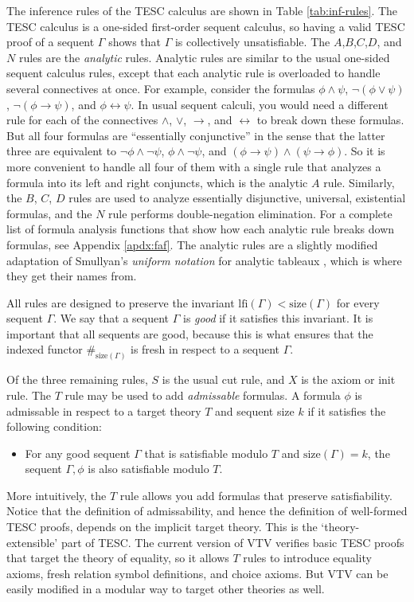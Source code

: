 \documentclass[12pt]{article}
\newcommand{\idf}[1]{\#_{#1}}
\newcommand{\lfi}[0]{\mathrm{lfi}}
\newcommand{\limp}[0]{\to}
\newcommand{\liff}[0]{\leftrightarrow}
\newcommand{\size}[0]{\mathrm{size}}
\begin{document}
The inference rules of the TESC calculus are shown in Table \ref{tab:inf-rules}.
The TESC calculus is a one-sided first-order sequent calculus, so having 
a valid TESC proof of a sequent $\Gamma$ shows that $\Gamma$ is collectively unsatisfiable.
The $A$,$B$,$C$,$D$, and $N$ rules are the \textit{analytic} rules. 
Analytic rules are similar to the usual one-sided sequent calculus rules, 
except that each analytic rule is overloaded to handle several connectives at once. 
For example, consider the formulas $\phi \land \psi$, $\lnot (\phi \lor \psi)$, 
$\lnot (\phi \limp \psi)$, and $\phi \liff \psi$. In usual sequent calculi, you would 
need a different rule for each of the connectives $\land$, $\lor$, $\limp$, and $\liff$ to 
break down these formulas. But all four formulas are ``essentially conjunctive'' 
in the sense that the latter three are equivalent to $\lnot \phi \land \lnot \psi$, 
$\phi \land \lnot \psi$, and $(\phi \limp \psi) \land (\psi \limp \phi)$.
So it is more convenient to handle all four of them with a single rule that analyzes 
a formula into its left and right conjuncts, which is the analytic $A$ rule.
Similarly, the $B$, $C$, $D$ rules are used to analyze essentially disjunctive, 
universal, existential formulas, and the $N$ rule performs double-negation elimination. 
For a complete list of formula analysis functions that show how each analytic 
rule breaks down formulas, see Appendix \ref{apdx:faf}. The analytic rules are 
a slightly modified adaptation of Smullyan's \textit{uniform notation} for analytic 
tableaux \cite{smullyan1995first}, which is where they get their names from. 

All rules are designed to preserve the invariant $\lfi(\Gamma) < \size(\Gamma)$ 
for every sequent $\Gamma$. We say that a sequent $\Gamma$ is \textit{good} if it satisfies 
this invariant. It is important that all sequents are good, because this is what ensures 
that the indexed functor $\idf{\size(\Gamma)}$ is fresh in respect to a sequent $\Gamma$.

Of the three remaining rules, $S$ is the usual cut rule, and $X$ is the axiom or init rule. 
The $T$ rule may be used to add \textit{admissable} formulas. A formula $\phi$ is admissable 
in respect to a target theory $T$ and sequent size $k$ if it satisfies the following condition:  
\begin{itemize}
  \item For any good sequent $\Gamma$ that is satisfiable modulo $T$ and $\size(\Gamma) = k$, the 
sequent $\Gamma, \phi$ is also satisfiable modulo $T$. 
\end{itemize}
More intuitively, the $T$ rule allows you add formulas that preserve satisfiability. 
Notice that the definition of admissability, and hence the definition of well-formed 
TESC proofs, depends on the implicit target theory. This is the `theory-extensible' part of TESC. 
The current version of VTV verifies basic TESC proofs that target the theory of equality, so it allows $T$ 
rules to introduce equality axioms, fresh relation symbol definitions, and choice axioms.
But VTV can be easily modified in a modular way to target other theories as well.
\end{document}
